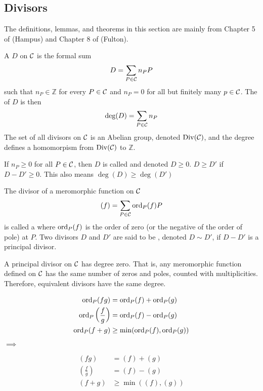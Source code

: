\subsection{Divisors}

The definitions, lemmas, and theorems in this section are mainly from Chapter 5 of \cite{ref:hampus} (Hampus) and Chapter 8 of \cite{ref:fulton} (Fulton).

\begin{definition}[divisor]
    A  $D$ on $\mathcal C$ is the formal sum $$D=\sum_{P\in\mathcal C}n_PP$$ such that $n_P\in\mathbb{Z}$ for every $P\in\mathcal C$ and $n_P=0$ for all but finitely many $p\in\mathcal C$. The  of $D$ is then $$\deg(D)=\sum_{P\in\mathcal C}n_P$$ The set of all divisors on $\mathcal C$ is an Abelian group, denoted $\operatorname{Div}(\mathcal C)$, and the degree defines a homomorpism from $\operatorname{Div}(\mathcal C)$ to $\mathbb{Z}$.
\end{definition}

\begin{definition}
    If $n_P\geq 0$ for all $P\in\mathcal C$, then $D$ is called  and denoted $D\geq 0$. $D\geq D'$ if $D-D'\geq 0$. This also means $\deg(D)\geq\deg(D')$ 
\end{definition}

\begin{definition}
    The divisor of a meromorphic function on $\mathcal C$
    $$(f)=\sum_{P\in\mathcal C}\operatorname{ord}_P(f)P$$
    is called a  where $\operatorname{ord}_P(f)$ is the order of zero (or the negative of the order of pole) at $P$. Two divisors $D$ and $D'$ are said to be , denoted $D\sim D'$, if $D-D'$ is a principal divisor.
    
    A principal divisor on $\mathcal C$ has degree zero. That is, any meromorphic function defined on $\mathcal C$ has the same number of zeros and poles, counted with multiplicities. Therefore, equivalent divisors have the same degree.
    
    \begin{minipage}{0.50\textwidth}
        \begin{align*}
            \operatorname{ord}_P(fg) &= \operatorname{ord}_P(f)+\operatorname{ord}_P(g) \\
            \operatorname{ord}_P\left(\frac{f}{g}\right) &= \operatorname{ord}_P(f)-\operatorname{ord}_P(g) \\
            \operatorname{ord}_P(f+g) &\geq \min(\operatorname{ord}_P(f),\operatorname{ord}_P(g))
        \end{align*}
    \end{minipage}
    \begin{minipage}{0.10\textwidth}
        $\implies$
    \end{minipage}
    \begin{minipage}{0.30\textwidth}
        \begin{align*}
            (fg) &= (f)+(g) \\
            \left(\frac{f}{g}\right) &= (f)-(g) \\
            (f+g) &\geq \min((f),(g))
        \end{align*}
    \end{minipage}
\end{definition}

